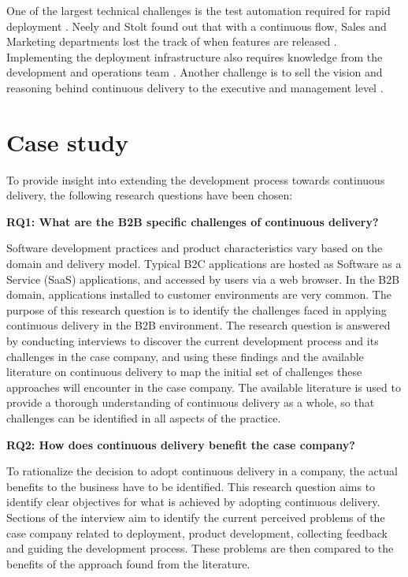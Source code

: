 \documentclass[lnbip]{svmultln}
\begin{document}
One of the largest technical challenges is the test automation required for rapid deployment \cite{cdbook, humble2006deployment}. Neely and Stolt found out that with a continuous flow, Sales and Marketing departments lost the track of when features are released \cite{neely2013continuous}. Implementing the deployment infrastructure also requires knowledge from the development and operations team \cite{humble2006deployment}. Another challenge is to sell the vision and reasoning behind continuous delivery to the executive and management level \cite{neely2013continuous}.

\section{Case study}
To provide insight into extending the development process towards continuous delivery, the following research questions have been chosen: \newline

\noindent \textbf{RQ1: What are the B2B specific challenges of continuous delivery?}

\noindent Software development practices and product characteristics vary based on the domain and delivery model. Typical B2C applications are hosted as Software as a Service (SaaS) applications, and accessed by users via a web browser. In the B2B domain, applications installed to customer environments are very common. The purpose of this research question is to identify the challenges faced in applying continuous delivery in the B2B environment. The research question is answered by conducting interviews to discover the current development process and its challenges in the case company, and using these findings and the available literature on continuous delivery to map the initial set of challenges these approaches will encounter in the case company. The available literature is used to provide a thorough understanding of continuous delivery as a whole, so that challenges can be identified in all aspects of the practice.\newline

\noindent \textbf{RQ2: How does continuous delivery benefit the case company?} %

\noindent To rationalize the decision to adopt continuous delivery in a company, the actual benefits to the business have to be identified. This research question aims to identify clear objectives for what is achieved by adopting continuous delivery. Sections of the interview aim to identify the current perceived problems of the case company related to deployment, product development, collecting feedback and guiding the development process. These problems are then compared to the benefits of the approach found from the literature.
\end{document}
